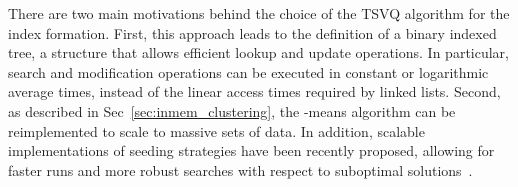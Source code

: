 There are two main motivations behind the choice of the TSVQ algorithm for the index formation. First, this approach leads to the definition of a binary indexed tree, a structure that allows efficient lookup and update operations. 
In particular, search and modification operations can be executed in constant or  logarithmic average times, instead of the  linear access times required by linked lists. 
Second, as described in Sec~\ref{sec:inmem_clustering}, the \mbox{-means} algorithm can be reimplemented to scale to massive sets of data.
In addition, scalable implementations of seeding strategies have been recently proposed, allowing for faster runs and more robust searches with respect to suboptimal solutions~\cite{bahmani2012scalable}. 

%
